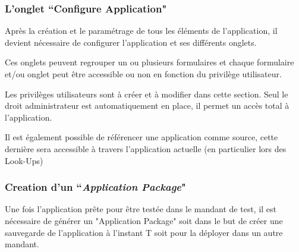\clearpage

\subsubsection{L'onglet ``Configure Application"}

Après la création et le paramétrage de tous les éléments de l'application, il devient nécessaire de configurer l'application et ses différents onglets.

Ces onglets peuvent regrouper un ou plusieurs formulaires et chaque formulaire et/ou onglet peut être accessible ou non en fonction du privilège utilisateur.

Les privilèges utilisateurs sont à créer et à modifier dans cette section. Seul le droit administrateur est automatiquement en place, il permet un accès total à l'application.

Il est également possible de référencer une application comme source, cette dernière sera accessible à travers l'application actuelle (en particulier lors des Look-Ups)

\subsubsection{Creation d'un ``\emph{Application Package}"}

Une fois l'application prête pour être testée dans le mandant de test, il est nécessaire de générer un "Application Package" soit dans le but de créer une sauvegarde de l'application à l'instant T soit pour la déployer dans un autre mandant.
\clearpage
